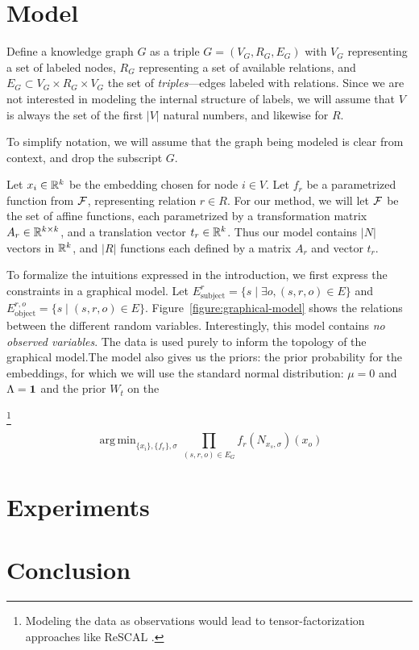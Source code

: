 \documentclass[11pt]{article}
\DeclareMathOperator*{\argmin}{arg\,min}
\begin{document}
\section{Model}
\label{section:model}

Define a knowledge graph $G$ as a triple $G = (V_G, R_G, E_G)$ with $V_G$ representing a set of labeled nodes, $R_G$ representing a set of available relations, and $E_G \subset V_G \times R_G \times V_G$ the set of \emph{triples}---edges labeled with relations. Since we are not interested in modeling the internal structure of labels, we will assume that $V$ is always the set of the first $|V|$ natural numbers, and likewise for $R$.

To simplify notation, we will assume that the graph being modeled is clear from context, and drop the subscript $G$.

Let $x_i \in {\mathbb R}^k$ be the embedding chosen for node $i \in V$. Let $f_r$ be a parametrized function from $\cal F$, representing relation $r \in R$. For our method, we will let $\cal F$ be the set of affine functions, each parametrized by a transformation matrix $A_r \in {\mathbb R}^{k\times k}$, and a translation vector $t_r\in {\mathbb R}^k$. Thus our model contains $|N|$ vectors in ${\mathbb R}^k$, and $|R|$ functions each defined by a matrix $A_r$ and vector $t_r$.

To formalize the intuitions expressed in the introduction, we first express the constraints in a graphical model. Let $E^r_\text{subject} = \{s \mid \exists o, (s, r, o) \in E\}$ and $E^{r, o}_\text{object} = \{ s \mid (s, r, o) \in E\}$. Figure~\ref{figure:graphical-model} shows the relations between the different random variables. Interestingly, this model contains \emph{no observed variables}. The data is used purely to inform the topology of the graphical model.\footnotemark The model also gives us the priors: the prior probability for the embeddings, for which we will use the standard normal distribution: $\mu = 0$ and $\Lambda = \bf{1}$ and the prior $W_t$ on the

\footnote{Modeling the data as observations would lead to tensor-factorization approaches like ReSCAL \cite{}.}



\[
\argmin_{\{x_i\}, \{f_r\}, \sigma} \prod_{(s,r,o) \in E_G} f_r(N_{x_s,\sigma})(x_o)
\]




\section{Experiments}

\section{Conclusion}



\end{document}
